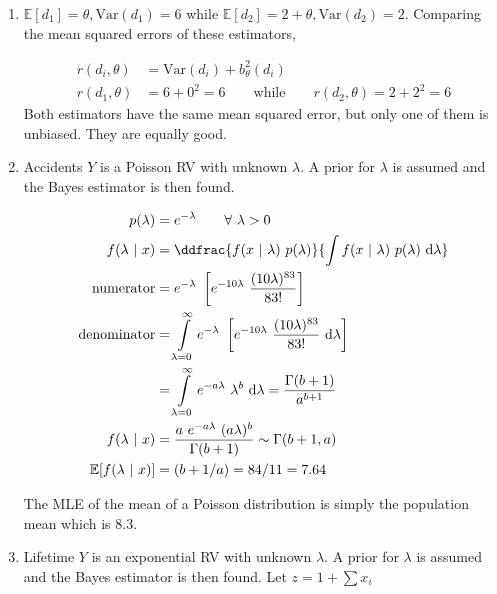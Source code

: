 \begin{enumerate}
	
	\item  $ \mathbb{E}[d_1] = \theta, \mathrm{Var}(d_1) = 6 $ while $ \mathbb{E}[d_2] = 2 + \theta, \mathrm{Var}(d_2) = 2 $. Comparing the mean squared errors of these estimators,
	
		\begin{align}
			r(d_i, \theta) &= \mathrm{Var}(d_i) + b_\theta^2 (d_i) \nonumber \\
			r(d_1, \theta) &= 6 + 0^2 = 6 \qquad \text{while} \qquad r(d_2, \theta) = 2 + 2^2 = 6
		\end{align}
		Both estimators have the same mean squared error, but only one of them is unbiased. They are equally good.
	
	
	\item Accidents $ Y $ is a Poisson RV with unknown $ \lambda $. A prior for $ \lambda $ is assumed and the Bayes estimator is then found.
	
		\begin{align}
			p(\lambda) &= e^{-\lambda} \qquad \forall\ \lambda > 0 \nonumber \\
			f(\lambda\ |\ x) &= \ddfrac{f(x\ |\ \lambda)\ p(\lambda)}{\int f(x\ |\ \lambda)\ p(\lambda)\ \mathrm{d}\lambda} \\
			\text{numerator}&= e^{-\lambda}\ \left[e^{-10\lambda}\ \dfrac{(10\lambda)^{83}}{83!}\right] \nonumber \\
			\text{denominator}&= \int\limits_{\lambda=0}^{\infty} e^{-\lambda}\ \left[e^{-10\lambda}\ \dfrac{(10\lambda)^{83}}{83!}\ \mathrm{d}\lambda\right] \nonumber \\
			&= \int\limits_{\lambda=0}^{\infty} e^{-a\lambda}\ \lambda^{b}\ \mathrm{d}\lambda = \frac{\Gamma(b+1)}{a^{b+1}}\nonumber \\
			f(\lambda\ |\ x) &= \frac{a\ e^{-a\lambda}\ (a\lambda)^{b}}{\Gamma(b+1)} \sim \Gamma(b+1, a) \\
			\mathbb{E}[f(\lambda\ |\ x)] &= (b+1/a) = 84/11 = 7.64
		\end{align}
		
		The MLE of the mean of a Poisson distribution is simply the population mean which is $ 8.3 $.
	
	
	\item Lifetime $ Y $ is an exponential RV with unknown $ \lambda $. A prior for $ \lambda $ is assumed and the Bayes estimator is then found. Let $ z = 1 + \sum x_i $\\
	

\end{enumerate}
